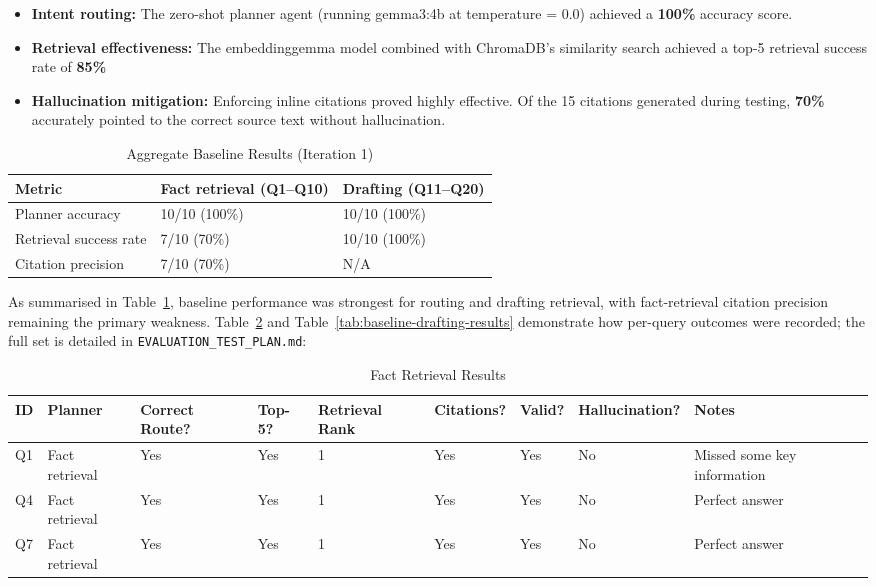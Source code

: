 \documentclass[11pt,a4paper]{article}
\begin{document}
\begin{itemize}

\item \textbf{Intent routing:} The zero-shot planner agent (running gemma3:4b at temperature = 0.0) achieved a \textbf{100\%} accuracy score.

\item \textbf{Retrieval effectiveness:} The embeddinggemma model combined with ChromaDB's similarity search achieved a top-5 retrieval success rate of \textbf{85\%}

\item \textbf{Hallucination mitigation:} Enforcing inline citations proved highly effective. Of the 15 citations generated during testing, \textbf{70\%} accurately pointed to the correct source text without hallucination. 

\end{itemize}

\begin{table}[!ht]
    \centering
    \begin{tabular}{|l|l|l|}
    \hline
        Metric & Fact retrieval (Q1–Q10) & Drafting (Q11–Q20) \\ \hline
        Planner accuracy & 10/10 (100\%) & 10/10 (100\%) \\ \hline
        Retrieval success rate & 7/10 (70\%) & 10/10 (100\%) \\ \hline
        Citation precision & 7/10 (70\%) & N/A \\ \hline
    \end{tabular}
    \caption{Aggregate Baseline Results (Iteration 1)}
    \label{tab:baseline-aggregate}
\end{table}

As summarised in Table~\ref{tab:baseline-aggregate}, baseline performance was strongest for routing and drafting retrieval, with fact-retrieval citation precision remaining the primary weakness. Table~\ref{tab:baseline-fact-results} and Table~\ref{tab:baseline-drafting-results} demonstrate how per-query outcomes were recorded; the full set is detailed in \texttt{EVALUATION\_TEST\_PLAN.md}:

    \begin{table}[H]
    \centering
    \begin{tabularx}{\textwidth}{|l|l|X|X|X|X|X|X|X|}
    \hline
      ID & Planner & Correct Route? & Top-5? & Retrie\-val Rank & Cita\-tions? & Valid? & Hal\-lu\-ci\-na\-tion? & Notes \\ \hline
        Q1 & Fact retrieval & Yes & Yes & 1 & Yes & Yes & No & Missed some key information \\ \hline
        Q4 & Fact retrieval & Yes & Yes & 1 & Yes & Yes & No & Perfect answer \\ \hline
        Q7 & Fact retrieval & Yes & Yes & 1 & Yes & Yes & No & Perfect answer \\ \hline
    \end{tabularx}

    \caption{Fact Retrieval Results}
    \label{tab:baseline-fact-results}
    \end{table}
\end{document}
